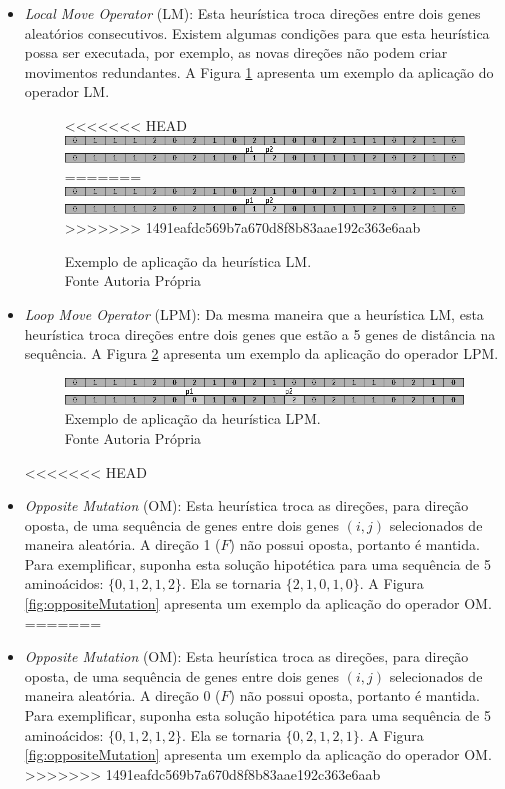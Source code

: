\begin{itemize}
 	
 	\item \textit{Local Move Operator} (LM): Esta heurística troca direções entre dois genes aleatórios consecutivos. Existem algumas condições para que esta heurística possa ser executada, por exemplo, as novas direções não podem criar movimentos redundantes. A Figura \ref{fig:localMoveOperator} apresenta um exemplo da aplicação do operador LM. 
 	
 	
 	\begin{figure}[!htb]
 		\centering
<<<<<<< HEAD
 		\includegraphics[scale=0.8]{Imagens/LocalMoveOperator.png}
=======
 		\includegraphics{Imagens/LocalMoveOperator.png}
>>>>>>> 1491eafdc569b7a670d8f8b83aae192c363e6aab
 		\caption{Exemplo de aplicação da heurística LM. \\Fonte Autoria Própria}
 		\label{fig:localMoveOperator}
 	\end{figure}
 	
 	
 	\item \textit{Loop Move Operator} (LPM): Da mesma maneira que a heurística LM, esta heurística troca direções entre dois genes que estão a 5 genes de distância na sequência. A Figura  \ref{fig:loopMoveOperator} apresenta um exemplo da aplicação do operador LPM.
 	
 	
 	\begin{figure}[!htb]
 		\centering
 		\includegraphics{Imagens/LoopMoveOperator.png}
 		\caption{Exemplo de aplicação da heurística LPM. \\Fonte Autoria Própria}
 		\label{fig:loopMoveOperator}
 	\end{figure}
 	
<<<<<<< HEAD
 	\item \textit{Opposite Mutation} (OM): Esta heurística troca as direções, para direção oposta, de uma sequência de genes entre dois genes $(i,j)$ selecionados de maneira aleatória. A direção 1 ($F$) não possui oposta, portanto é mantida. Para exemplificar, suponha esta solução hipotética para uma sequência de 5 aminoácidos: $\{0,1,2,1,2\}$. Ela se tornaria $\{2,1,0,1,0\}$. A Figura \ref{fig:oppositeMutation} apresenta um exemplo da aplicação do operador OM.
=======
 	\item \textit{Opposite Mutation} (OM): Esta heurística troca as direções, para direção oposta, de uma sequência de genes entre dois genes $(i,j)$ selecionados de maneira aleatória. A direção 0 ($F$) não possui oposta, portanto é mantida. Para exemplificar, suponha esta solução hipotética para uma sequência de 5 aminoácidos: $\{0,1,2,1,2\}$. Ela se tornaria $\{0,2,1,2,1\}$. A Figura \ref{fig:oppositeMutation} apresenta um exemplo da aplicação do operador OM.
>>>>>>> 1491eafdc569b7a670d8f8b83aae192c363e6aab
 	

\end{itemize}
